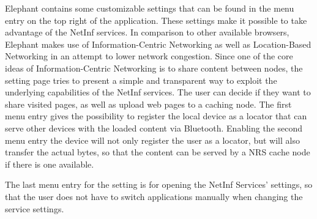 Elephant contains some customizable settings that can be found in the menu entry on the top right of the application.
These settings make it possible to take advantage of the NetInf services. In comparison to other
available browsers, Elephant makes use of Information-Centric Networking as well as Location-Based Networking
in an attempt to lower network congestion.
Since one of the core ideas of Information-Centric Networking is to share content between nodes, the setting page
tries to present a simple and transparent way to exploit the underlying capabilities of the NetInf services.
The user can decide if they want to share visited pages, as well as upload web pages to a caching node.
The first menu entry gives the possibility to register the local device as a locator that can serve other devices
with the loaded content via Bluetooth.
Enabling the second menu entry the device will not only register the user as a locator, but will also transfer the actual bytes,
so that the content can be served by a NRS cache node if there is one available.

The last menu entry for the setting is for opening the NetInf Services' settings, so that the user does not have to switch applications
manually when changing the service settings.
\newpage

